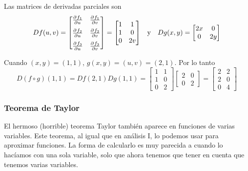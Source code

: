 \documentclass[12pt]{article}
\begin{document}
Las matrices de derivadas parciales son
\begin{align*}
  Df(u,v)=\begin{bmatrix}
	  \pdv[]{f_{1}}{u} & \pdv[]{f_{1}}{v} \\[1.5ex]
	  \pdv[]{f_{2}}{u} & \pdv[]{f_{2}}{v} \\[1.5ex]
	  \pdv[]{f_{3}}{u} & \pdv[]{f_{3}}{v}
  \end{bmatrix}=\begin{bmatrix}
	  1 & 1 \\
	  1 & 0 \\
	  0 & 2v
  \end{bmatrix} && \text{y} &&
  Dg(x,y)=\begin{bmatrix}
	  2x & 0 \\
	  0 & 2y
  \end{bmatrix}
\end{align*}

Cuando $ (x,y)=(1,1) $, $ g(x,y)=(u,v)=(2,1) $. Por lo tanto
\[
	D(f\circ g)(1,1)=Df(2,1)Dg(1,1)=\begin{bmatrix}
		1 & 1 \\
		1 & 0 \\
		0 & 2
	\end{bmatrix}\begin{bmatrix}
		2 & 0 \\
		0 & 2
	\end{bmatrix}=\begin{bmatrix}
		2 & 2 \\
		2 & 0 \\
		0 & 4
	\end{bmatrix}
\]

\subsubsection{Teorema de Taylor}
El hermoso (horrible) teorema Taylor también aparece en funciones de varias variables. Este teorema, al igual que en análisis I, lo podemos usar para aproximar funciones. La forma de calcularlo es muy parecida a cuando lo hacíamos con una sola variable, solo que ahora tenemos que tener en cuenta que tenemos varias variables.

\vspace{0.2cm}
\vspace{0.2cm}
\end{document}
